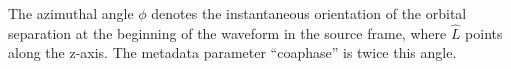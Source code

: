 \documentclass[aps,prd,amssymb,amsmath,amsfonts,superscriptaddress,
floatfix ,preprintnumbers,altaffilletter]{revtex4}
\begin{document}
The azimuthal angle $\phi$ denotes the instantaneous orientation of the orbital separation at the beginning of the waveform in the source frame, where $\hat{L}$ points along the z-axis. The metadata parameter ``coa\textunderscore phase'' is twice this angle.

%




\end{document}
